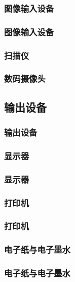 \documentclass{beamer}
\newcommand{\fullPageImage}[2]{
	{
		\usebackgroundtemplate{\texttt{[image: \#1]}}
		\frame[plain]{#2}
	}
}
\begin{document}
\fullPageImage{images/biggest_projected_capacitive_display_r7p8n.jpg}{\transdissolve}

\subsubsection{图像输入设备}
\begin{frame}
	\frametitle{图像输入设备}

\end{frame}

\begin{frame}
	\frametitle{扫描仪}

\end{frame}

\begin{frame}
	\frametitle{数码摄像头}

\end{frame}

\subsection{输出设备}
\begin{frame}
	\frametitle{输出设备}

\end{frame}

\subsubsection{显示器}
\begin{frame}
	\frametitle{显示器}

\end{frame}

\subsubsection{打印机}
\begin{frame}
	\frametitle{打印机}

\end{frame}

\subsubsection{电子纸与电子墨水}
\begin{frame}
	\frametitle{电子纸与电子墨水}

\end{frame}
\end{document}
